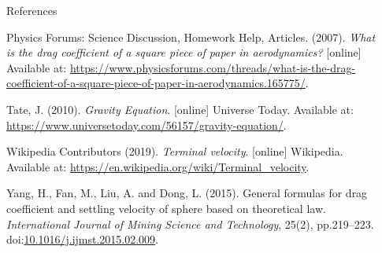 \documentclass[final]{beamer}
\newlength{\sepwidth}
\newlength{\colwidth}
\newcommand{\separatorcolumn}{\begin{column}{\sepwidth}\end{column}}
\begin{document}
\begin{frame}[t]
\begin{columns}[t]
\begin{column}{\colwidth}
\begin{block}{References}
\begin{thebibliography}{9}
Physics Forums: Science Discussion, Homework Help, Articles. (2007). \emph{What is the drag coefficient of a square piece of paper in aerodynamics?} [online] Available at: \url{https://www.physicsforums.com/threads/what-is-the-drag-coefficient-of-a-square-piece-of-paper-in-aerodynamics.165775/}.

Tate, J. (2010). \emph{Gravity Equation}. [online] Universe Today. Available at: \url{https://www.universetoday.com/56157/gravity-equation/}.

Wikipedia Contributors (2019). \emph{Terminal velocity}. [online] Wikipedia. Available at: \url{https://en.wikipedia.org/wiki/Terminal_velocity}.

Yang, H., Fan, M., Liu, A. and Dong, L. (2015). General formulas for drag coefficient and settling velocity of sphere based on theoretical law. \emph{International Journal of Mining Science and Technology}, 25(2), pp.219–223. doi:\href{https://doi.org/10.1016/j.ijmst.2015.02.009}{10.1016/j.ijmst.2015.02.009}.
\end{thebibliography}
\endgroup
  \end{block}

\end{column}

\separatorcolumn
\end{columns}
\end{frame}
\end{document}
